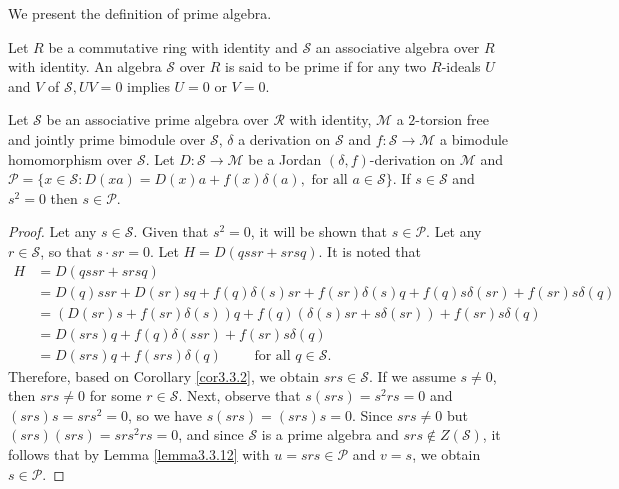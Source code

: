 \documentclass{arxiv}
\begin{document}
We present the definition of prime algebra.
\begin{definition}
    \cite{erickson}
    Let $R$ be a commutative ring with identity and $\mathcal{S}$ an associative algebra over $R$ with identity. An algebra $\mathcal{S}$ over $R$ is said to be prime if for any two $R$-ideals $U$ and $V$ of $\mathcal{S}, UV=0$ implies $U=0$ or $V=0$.
\end{definition}

\begin{lemma}\label{lemma3.3.13}
    Let $\mathcal{S}$ be an associative prime algebra over $\mathcal{R}$ with identity, $\mathcal{M}$ a $2$-torsion free and jointly prime bimodule over $\mathcal{S}$, $\delta$ a derivation on $\mathcal{S}$ and $f : \mathcal{S} \rightarrow \mathcal{M}$ a bimodule homomorphism over $\mathcal{S}$. Let $D:\mathcal{S} \rightarrow \mathcal{M}$ be a Jordan $(\delta,f)$-derivation on $\mathcal{M}$ and $\mathcal{P}=\{ x \in \mathcal{S} : D(xa) = D(x)a+f(x)\delta(a), \text{ for all } a \in \mathcal{S}\}$. If $s \in \mathcal{S}$ and $s^2 = 0$ then $s \in \mathcal{P}$.
\end{lemma}
\begin{proof}
    Let any $s \in \mathcal{S}$. Given that $s^2 = 0$, it will be shown that $s \in \mathcal{P}$. Let any $r \in \mathcal{S}$, so that $s \cdot sr = 0$. Let $H = D(qssr+srsq)$. It is noted that 
    \begin{align*}
        H &= D(qssr + srsq)\\
        &= D(q)ssr + D(sr)sq + f(q)\delta(s)sr + f(sr)\delta(s)q + f(q) s\delta(sr) + f(sr) s\delta(q)\\
        &= (D(sr)s+f(sr)\delta(s))q + f(q)(\delta(s)sr+s\delta(sr))+f(sr)s\delta(q)\\
        &= D(srs)q + f(q)\delta(ssr)+f(sr)s\delta(q)\\
        &= D(srs)q + f(srs)\delta(q) \quad \quad \text{ for all } q \in \mathcal{S}.
    \end{align*}
    Therefore, based on Corollary \ref{cor3.3.2}, we obtain $srs \in \mathcal{S}$. If we assume $s \ne 0$, then $srs \ne 0$ for some $r \in \mathcal{S}$. Next, observe that $s(srs) =s^2rs=0$ and $(srs)s=srs^2=0$, so we have $s(srs)=(srs)s=0$. Since $srs \ne 0$ but $(srs)(srs)=srs^2rs=0$, and since $\mathcal{S}$ is a prime algebra and $srs \notin Z(\mathcal{S})$, it follows that by Lemma \ref{lemma3.3.12} with $u=srs \in \mathcal{P}$ and $v=s$, we obtain $s \in \mathcal{P}$.
\end{proof}
\end{document}
